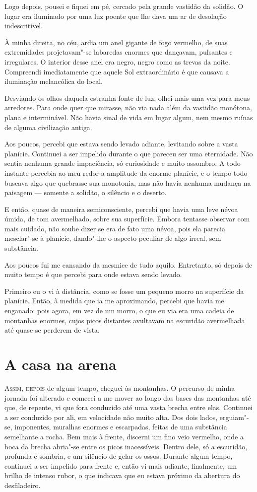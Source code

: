Logo depois, pousei e fiquei em pé, cercado pela grande vastidão da solidão. O lugar era iluminado por uma luz
poente que lhe dava um ar de desolação indescritível.

À minha direita, no céu, ardia um anel gigante de fogo vermelho, de suas extremidades projetavam"-se labaredas enormes
que dançavam, pulsantes e irregulares. O interior desse anel era negro, negro como as trevas da noite. Compreendi
imediatamente que aquele Sol extraordinário é que causava a iluminação melancólica do local.

Desviando os olhos daquela estranha fonte de luz, olhei mais uma vez para meus arredores. Para onde quer que mirasse,
não via nada além da vastidão monótona, plana e interminável. Não havia sinal de vida em lugar algum, nem mesmo ruínas
de alguma civilização antiga.

Aos poucos, percebi que estava sendo levado adiante, levitando sobre a vasta planície. Continuei a ser impelido durante
o que pareceu ser uma eternidade. Não sentia nenhuma grande impaciência, só curiosidade e muito assombro. A
todo instante percebia ao meu redor a amplitude da enorme planície, e o tempo todo buscava algo que quebrasse sua monotonia, mas
não havia nenhuma mudança na paisagem --- somente a solidão, o silêncio e o deserto.

E então, quase de maneira semiconsciente, percebi que havia uma leve névoa úmida, de tom avermelhado, sobre sua
superfície. Embora tentasse observar com mais cuidado, não soube dizer se era de fato uma névoa, pois ela parecia
mesclar"-se à planície, dando"-lhe o aspecto peculiar de algo irreal, sem substância.

Aos poucos fui me cansando da mesmice de tudo aquilo. Entretanto, só depois de muito tempo é que percebi para onde
estava sendo levado.

Primeiro eu o vi à distância, como se fosse um pequeno morro na superfície da planície. Então, à medida que ia me
aproximando, percebi que havia me enganado: pois agora, em vez de um morro, o que eu via era uma cadeia de montanhas
enormes, cujos picos distantes avultavam na escuridão avermelhada até quase se perderem de vista.


\clearpage

\chapter{A casa na arena}

\textsc{Assim, depois} de algum tempo, cheguei às montanhas. O percurso de minha jornada foi alterado e comecei a me
mover ao longo das bases das montanhas até que, de repente, vi que fora conduzido até uma vasta brecha entre elas.
Continuei a ser conduzido por ali, em velocidade não muito alta. Dos dois lados, erguiam"-se, imponentes, muralhas
enormes e escarpadas, feitas de uma substância semelhante a rocha. Bem mais à frente, discerni um fino veio vermelho,
onde a boca da brecha abria"-se entre os picos inacessíveis. Dentro dele, só a escuridão, profunda e sombria, e um
silêncio de gelar os ossos. Durante algum tempo, continuei a ser impelido para frente e, então vi mais adiante,
finalmente, um brilho de intenso rubor, o que indicava que eu estava próximo da abertura do desfiladeiro.


